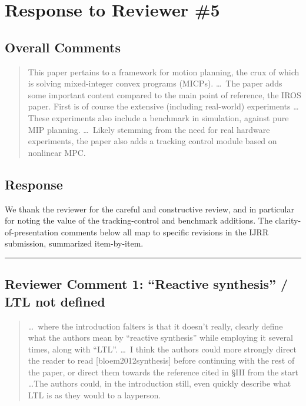 \section{Response to Reviewer \#5}
\subsection*{Overall Comments}
\begin{mdframed}
\begin{quote}
This paper pertains to a framework for motion planning, the crux of which is solving mixed-integer convex programs (MICPs). \ldots\ The paper adds some important content compared to the main point of reference, the IROS paper. First is of course the extensive (including real-world) experiments \ldots These experiments also include a benchmark in simulation, against pure MIP planning. \ldots\ Likely stemming from the need for real hardware experiments, the paper also adds a tracking control module based on nonlinear MPC.
\end{quote}
\end{mdframed}

\subsection{Response}
We thank the reviewer for the careful and constructive review, and in particular for noting the value of the tracking-control and benchmark additions. The clarity-of-presentation comments below all map to specific revisions in the IJRR submission, summarized item-by-item.

\noindent\rule{17cm}{2.0pt}

\subsection{Reviewer Comment 1: ``Reactive synthesis'' / LTL not defined}
\begin{mdframed}
\begin{quote}
\ldots\ where the introduction falters is that it doesn't really, clearly define what the authors mean by ``reactive synthesis'' while employing it several times, along with ``LTL''. \ldots\ I think the authors could more strongly direct the reader to read [bloem2012synthesis] before continuing with the rest of the paper, or direct them towards the reference cited in \S III from the start \ldots The authors could, in the introduction still, even quickly describe what LTL is as they would to a layperson.
\end{quote}
\end{mdframed}

